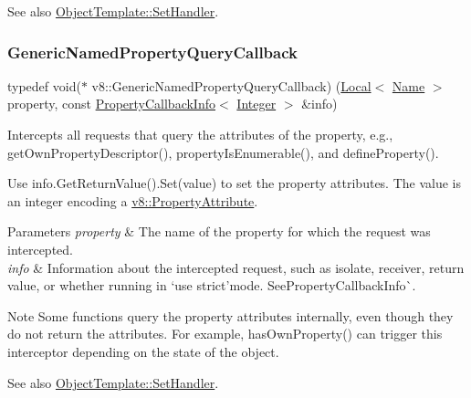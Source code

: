 See also {\ttfamily \mbox{\hyperlink{classv8_1_1ObjectTemplate_a3d5666f1e9b0f46df6b4dbb7cfbb6114}{Object\+Template\+::\+Set\+Handler}}}. \mbox{\label{namespacev8_add9f7ab11e4a9a2b9ad2c4536b0e1a64}} 
\subsubsection{\texorpdfstring{Generic\+Named\+Property\+Query\+Callback}{GenericNamedPropertyQueryCallback}}
{\footnotesize\ttfamily typedef void($\ast$ v8\+::\+Generic\+Named\+Property\+Query\+Callback) (\mbox{\hyperlink{classv8_1_1Local}{Local}}$<$ \mbox{\hyperlink{classv8_1_1Name}{Name}} $>$ property, const \mbox{\hyperlink{classv8_1_1PropertyCallbackInfo}{Property\+Callback\+Info}}$<$ \mbox{\hyperlink{classv8_1_1Integer}{Integer}} $>$ \&info)}

Intercepts all requests that query the attributes of the property, e.\+g., get\+Own\+Property\+Descriptor(), property\+Is\+Enumerable(), and define\+Property().

Use {\ttfamily info.\+Get\+Return\+Value().Set(value)} to set the property attributes. The value is an integer encoding a {\ttfamily \mbox{\hyperlink{namespacev8_a05f25f935e108a1ea2d150e274602b87}{v8\+::\+Property\+Attribute}}}.


\begin{DoxyParams}{Parameters}
{\em property} & The name of the property for which the request was intercepted. \\
\hline
{\em info} & Information about the intercepted request, such as isolate, receiver, return value, or whether running in `\textquotesingle{}use strict'{\ttfamily mode. See}Property\+Callback\+Info\`{}.\\
\hline
\end{DoxyParams}
\begin{DoxyNote}{Note}
Some functions query the property attributes internally, even though they do not return the attributes. For example, {\ttfamily has\+Own\+Property()} can trigger this interceptor depending on the state of the object.
\end{DoxyNote}
See also {\ttfamily \mbox{\hyperlink{classv8_1_1ObjectTemplate_a3d5666f1e9b0f46df6b4dbb7cfbb6114}{Object\+Template\+::\+Set\+Handler}}.} \mbox{\label{namespacev8_af74716c6e95a269c6cd4314662fd0a7e}} 
